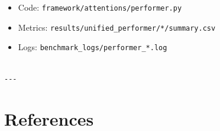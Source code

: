 \begin{itemize}
\item Code: \texttt{framework/attentions/performer.py}
\item Metrics: \texttt{results/unified\_performer/*/summary.csv}
\item Logs: \texttt{benchmark\_logs/performer\_*.log}
\end{itemize}
\begin{lstlisting}

---
\end{lstlisting}


\section{References}

